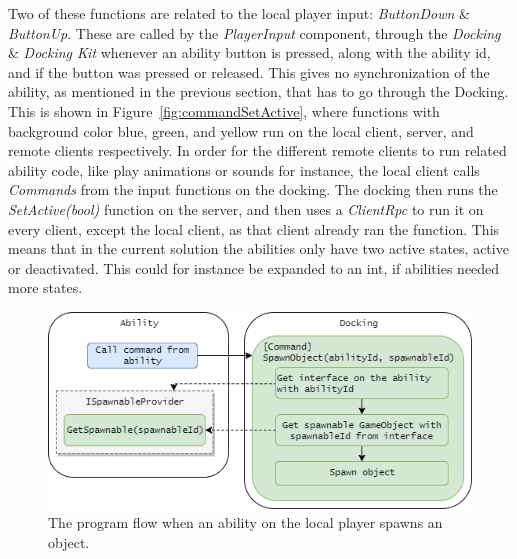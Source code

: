 Two of these functions are related to the local player input: \emph{ButtonDown} \& \emph{ButtonUp}. These are called by the \emph{PlayerInput} component, through the \emph{Docking} \& \emph{Docking Kit} whenever an ability button is pressed, along with the ability id, and if the button was pressed or released. This gives no synchronization of the ability, as mentioned in the previous section, that has to go through the Docking. This is shown in Figure~\ref{fig:commandSetActive}, where functions with background color blue, green, and yellow run on the local client, server, and remote clients respectively. In order for the different remote clients to run related ability code, like play animations or sounds for instance, the local client calls \emph{Commands} from the input functions on the docking. The docking then runs the \emph{SetActive(bool)} function on the server, and then uses a \emph{ClientRpc} to run it on every client, except the local client, as that client already ran the function. This means that in the current solution the abilities only have two active states, active or deactivated. This could for instance be expanded to an int, if abilities needed more states.

\begin{figure}[tbph]
  \centering
  \includegraphics[width=.9\textwidth]{images/SpawnObject}
  \caption[Program flow on ability spawning object]{The program flow when an ability on the local player spawns an object.}
  \label{fig:spawnObject}
\end{figure}

